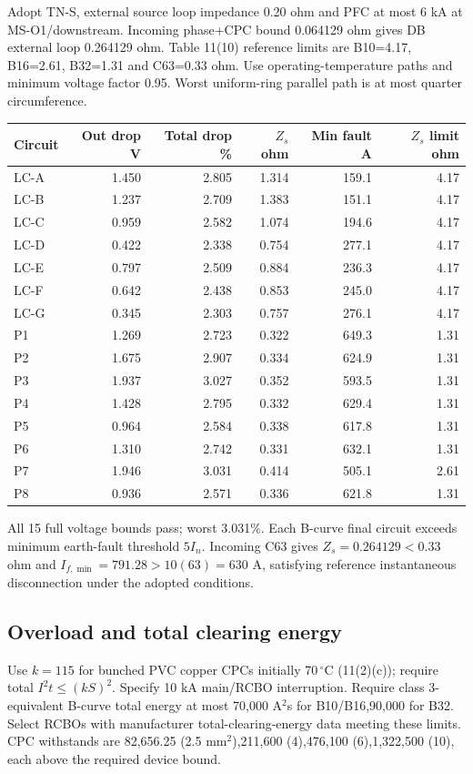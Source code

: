 Adopt TN-S, external source loop impedance 0.20 ohm and PFC at most 6 kA at MS-O1/downstream.  Incoming phase+CPC bound 0.064129 ohm gives DB external loop 0.264129 ohm. Table 11(10) reference limits are B10=4.17, B16=2.61, B32=1.31 and C63=0.33 ohm. Use operating-temperature paths and minimum voltage factor 0.95. Worst uniform-ring parallel path is at most quarter circumference.
\begin{longtable}{lrrrrr}\toprule
Circuit & Out drop V & Total drop \% & $Z_s$ ohm & Min fault A & $Z_s$ limit ohm\\\midrule\endhead

LC-A & 1.450 & 2.805 & 1.314 & 159.1 & 4.17 \\
LC-B & 1.237 & 2.709 & 1.383 & 151.1 & 4.17 \\
LC-C & 0.959 & 2.582 & 1.074 & 194.6 & 4.17 \\
LC-D & 0.422 & 2.338 & 0.754 & 277.1 & 4.17 \\
LC-E & 0.797 & 2.509 & 0.884 & 236.3 & 4.17 \\
LC-F & 0.642 & 2.438 & 0.853 & 245.0 & 4.17 \\
LC-G & 0.345 & 2.303 & 0.757 & 276.1 & 4.17 \\
P1 & 1.269 & 2.723 & 0.322 & 649.3 & 1.31 \\
P2 & 1.675 & 2.907 & 0.334 & 624.9 & 1.31 \\
P3 & 1.937 & 3.027 & 0.352 & 593.5 & 1.31 \\
P4 & 1.428 & 2.795 & 0.332 & 629.4 & 1.31 \\
P5 & 0.964 & 2.584 & 0.338 & 617.8 & 1.31 \\
P6 & 1.310 & 2.742 & 0.331 & 632.1 & 1.31 \\
P7 & 1.946 & 3.031 & 0.414 & 505.1 & 2.61 \\
P8 & 0.936 & 2.571 & 0.336 & 621.8 & 1.31 \\

\bottomrule\end{longtable}
All 15 full voltage bounds pass;  worst 3.031\%. Each B-curve final circuit exceeds minimum earth-fault threshold $5I_n$. Incoming C63 gives $Z_s=0.264129<0.33$ ohm and $I_{f,\min}=791.28>10(63)=630$ A, satisfying reference instantaneous disconnection under the adopted conditions.
\subsection*{Overload and total clearing energy}
Use $k=115$ for bunched PVC copper CPCs initially 70\,$^\circ$C (11(2)(c));  require total $I^2t\le(kS)^2$. Specify 10 kA main/RCBO interruption. Require class 3-equivalent B-curve total energy at most 70,000 A$^2$s for B10/B16,90,000 for B32. Select RCBOs with manufacturer total-clearing-energy data meeting these limits. CPC withstands are 82,656.25 (2.5 mm$^2$),211,600 (4),476,100 (6),1,322,500 (10), each above the required device bound.

